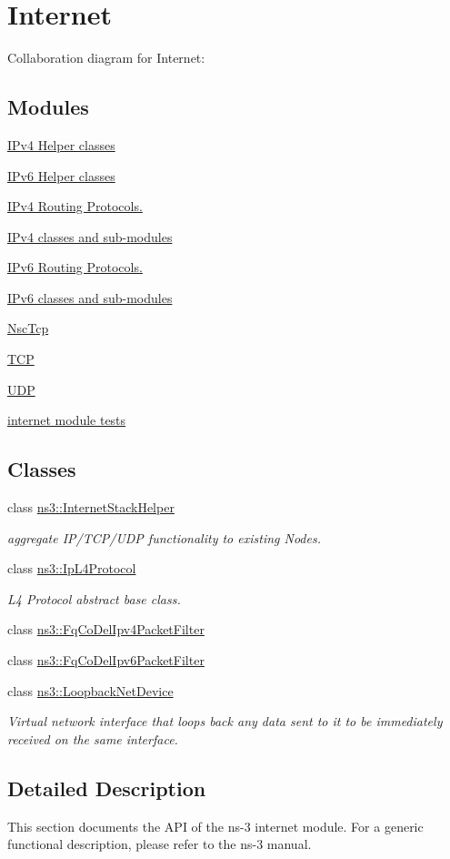 \hypertarget{group__internet}{}\section{Internet}
\label{group__internet}
Collaboration diagram for Internet\+:
\subsection*{Modules}
\begin{DoxyCompactItemize}
\item 
\hyperlink{group__ipv4Helpers}{I\+Pv4 Helper classes}
\item 
\hyperlink{group__ipv6Helpers}{I\+Pv6 Helper classes}
\item 
\hyperlink{group__ipv4Routing}{I\+Pv4 Routing Protocols.}
\item 
\hyperlink{group__ipv4}{I\+Pv4 classes and sub-\/modules}
\item 
\hyperlink{group__ipv6Routing}{I\+Pv6 Routing Protocols.}
\item 
\hyperlink{group__ipv6}{I\+Pv6 classes and sub-\/modules}
\item 
\hyperlink{group__nsctcp}{Nsc\+Tcp}
\item 
\hyperlink{group__tcp}{T\+CP}
\item 
\hyperlink{group__udp}{U\+DP}
\item 
\hyperlink{group__internet-test}{internet module tests}
\end{DoxyCompactItemize}
\subsection*{Classes}
\begin{DoxyCompactItemize}
\item 
class \hyperlink{classns3_1_1InternetStackHelper}{ns3\+::\+Internet\+Stack\+Helper}
\begin{DoxyCompactList}\small\item\em aggregate I\+P/\+T\+C\+P/\+U\+DP functionality to existing Nodes. \end{DoxyCompactList}\item 
class \hyperlink{classns3_1_1IpL4Protocol}{ns3\+::\+Ip\+L4\+Protocol}
\begin{DoxyCompactList}\small\item\em L4 Protocol abstract base class. \end{DoxyCompactList}\item 
class \hyperlink{classns3_1_1FqCoDelIpv4PacketFilter}{ns3\+::\+Fq\+Co\+Del\+Ipv4\+Packet\+Filter}
\item 
class \hyperlink{classns3_1_1FqCoDelIpv6PacketFilter}{ns3\+::\+Fq\+Co\+Del\+Ipv6\+Packet\+Filter}
\item 
class \hyperlink{classns3_1_1LoopbackNetDevice}{ns3\+::\+Loopback\+Net\+Device}
\begin{DoxyCompactList}\small\item\em Virtual network interface that loops back any data sent to it to be immediately received on the same interface. \end{DoxyCompactList}\end{DoxyCompactItemize}


\subsection{Detailed Description}
This section documents the A\+PI of the ns-\/3 internet module. For a generic functional description, please refer to the ns-\/3 manual. 
